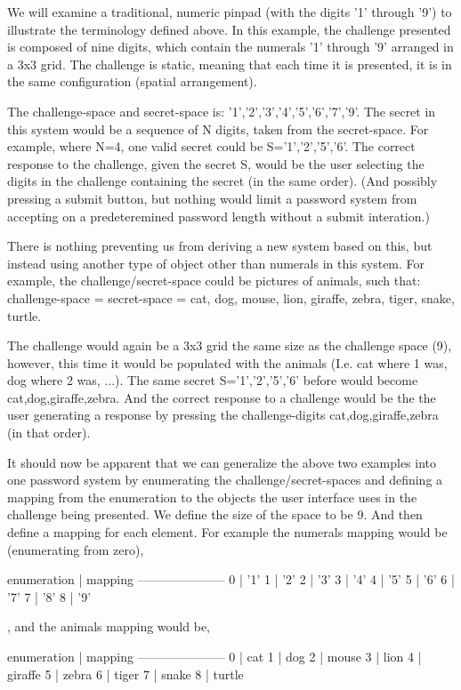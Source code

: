 \documentclass[12pt]{document}
\begin{document}
\begin{Introduction}
\begin{SCRAP -layman}
We will examine a traditional, numeric pinpad (with the digits '1' through '9') to illustrate the terminology defined above.
In this example, the challenge presented is composed of nine digits, which contain the numerals '1' through '9' arranged in a 3x3 grid. The challenge is static, meaning that each time it is presented, it is in the same configuration (spatial arrangement). 

The challenge-space and secret-space is: {'1','2','3','4','5','6','7','9'}.  The secret in this system would be a sequence of N digits, taken from the secret-space. For example, where N=4, one valid secret could be S={'1','2','5','6'}. The correct response to the challenge, given the secret S, would be the user selecting the digits in the challenge containing the secret (in the same order). (And possibly pressing a submit button, but nothing would limit a password system from accepting on a predeteremined password length without a submit interation.)


There is nothing preventing us from deriving a new system based on this, but instead using another type of object other than numerals in this system. For example, the challenge/secret-space could be pictures of animals, such that:
challenge-space = secret-space = {cat, dog, mouse, lion, giraffe, zebra, tiger, snake, turtle}.

The challenge would again be a 3x3 grid the same size as the challenge space (9), however, this time it would be populated with the animals (I.e. cat where 1 was, dog where 2 was, ...).
The same secret S={'1','2','5','6'}  before would become {cat,dog,giraffe,zebra}. And the correct response to a challenge would be the the user generating a response by pressing the challenge-digits {cat,dog,giraffe,zebra} (in that order).

It should now be apparent that we can generalize the above two examples into one password system by enumerating the challenge/secret-spaces and defining a mapping from the enumeration to the objects the user interface uses in the challenge being presented.
We define the size of the space to be 9. And then define a mapping for each element.
For example the numerals mapping would be (enumerating from zero),

enumeration | mapping 
---------------------
0 | '1'
1 | '2'
2 | '3'
3 | '4'
4 | '5'
5 | '6'
6 | '7'
7 | '8'
8 | '9'

, and the animals mapping would be,

enumeration | mapping 
---------------------
0 | cat
1 | dog
2 | mouse
3 | lion
4 | giraffe
5 | zebra
6 | tiger
7 | snake
8 | turtle


\end{SCRAP -layman}
\end{Introduction}
\end{document}
